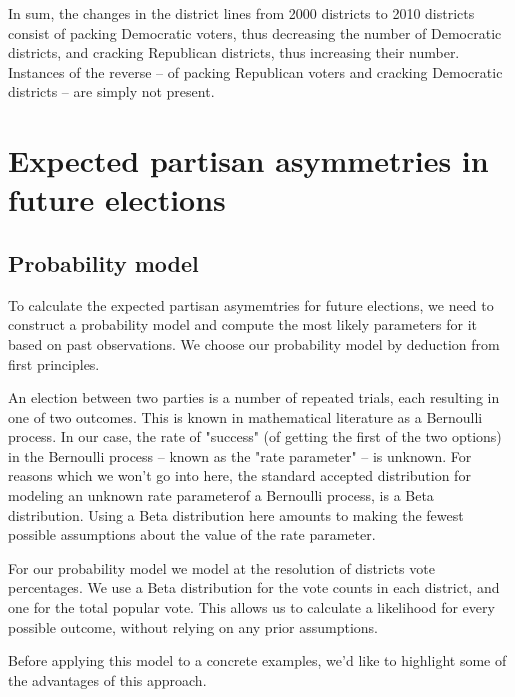 \documentclass[preprint,12pt]{article}
\begin{document}
In sum, the changes in the district lines from 2000 districts to 2010 districts consist of packing Democratic voters, thus decreasing the number of Democratic districts, and cracking Republican districts, thus increasing their number.
Instances of the reverse -- of packing Republican voters and cracking Democratic districts -- are simply not present.

\section{Expected  partisan asymmetries in future elections}

\subsection{Probability model}

To calculate the expected partisan asymemtries for future elections, we need to construct a probability model and compute the most likely parameters for it based on past observations.
We choose our probability model by deduction from first principles.

An election between two parties is a number of repeated trials, each resulting in one of two outcomes.  This is known in mathematical literature as a Bernoulli process.
In our case, the rate of "success" (of getting the first of the two options) in the Bernoulli process -- known as the "rate parameter" -- is unknown.
For reasons which we won't go into here, the standard accepted distribution for modeling an unknown rate parameterof a Bernoulli process, is a Beta distribution.
Using a Beta distribution here amounts to making the fewest possible assumptions about the value of the rate parameter.

For our probability model we model at the resolution of districts vote percentages.
We use a Beta distribution for the vote counts in each district, and one for the total popular vote.
This allows us to calculate a likelihood for every possible outcome, without relying on any prior assumptions.

Before applying this model to a concrete examples, we'd like to highlight some of the advantages of this approach.
\end{document}
